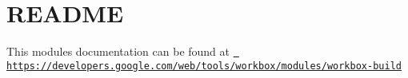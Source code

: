 \chapter{README}
\hypertarget{md_node__modules_2workbox-build_2README}{}\label{md_node__modules_2workbox-build_2README}
This module\textquotesingle{}s documentation can be found at \href{https://developers.google.com/web/tools/workbox/modules/workbox-build}{\texttt{ https\+://developers.\+google.\+com/web/tools/workbox/modules/workbox-\/build}} 